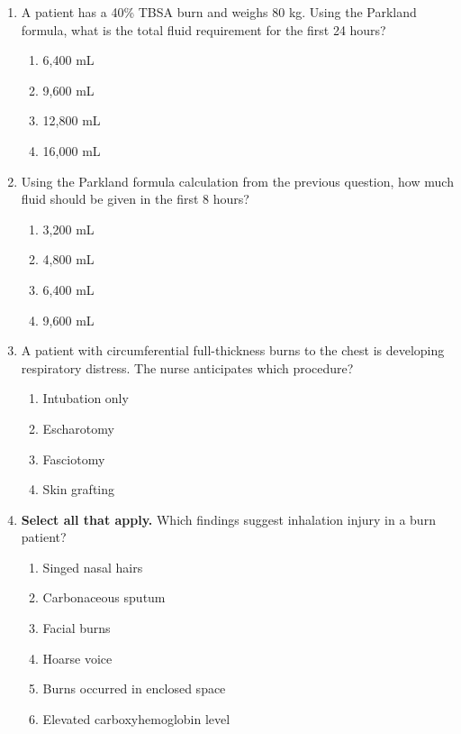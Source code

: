 \documentclass[11pt]{article}
\begin{document}
\begin{enumerate}
\item A patient has a 40\% TBSA burn and weighs 80 kg. Using the Parkland formula, what is the total fluid requirement for the first 24 hours?

\begin{enumerate}[label=\Alph*.]
    \item 6,400 mL
    \item 9,600 mL
    \item 12,800 mL
    \item 16,000 mL
\end{enumerate}

\item Using the Parkland formula calculation from the previous question, how much fluid should be given in the first 8 hours?

\begin{enumerate}[label=\Alph*.]
    \item 3,200 mL
    \item 4,800 mL
    \item 6,400 mL
    \item 9,600 mL
\end{enumerate}

\item A patient with circumferential full-thickness burns to the chest is developing respiratory distress. The nurse anticipates which procedure?

\begin{enumerate}[label=\Alph*.]
    \item Intubation only
    \item Escharotomy
    \item Fasciotomy
    \item Skin grafting
\end{enumerate}

\item \textbf{Select all that apply.} Which findings suggest inhalation injury in a burn patient?

\begin{enumerate}[label=\Alph*.]
    \item Singed nasal hairs
    \item Carbonaceous sputum
    \item Facial burns
    \item Hoarse voice
    \item Burns occurred in enclosed space
    \item Elevated carboxyhemoglobin level
\end{enumerate}


\end{enumerate}
\end{document}
